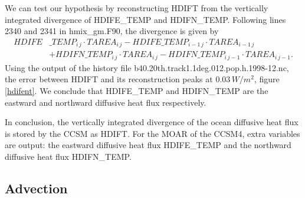 \begin{appendices}
We can test our hypothesis by reconstructing HDIFT from the vertically integrated divergence of HDIFE\_TEMP and HDIFN\_TEMP. Following lines 2340 and 2341 in hmix\_gm.F90, the divergence is given by 
\begin{align}\label{diveq}
HDIFE&\_TEMP_{i \, j}\cdot  TAREA_{i \, j}- HDIFE\_TEMP_{i-1 \, j}\cdot TAREA_{i-1 \, j} \\
&+ HDIFN\_TEMP_{i \, j}\cdot TAREA_{i \, j} - HDIFN\_TEMP_{i \, j-1}\cdot TAREA_{i \, j-1}.
\end{align}
Using the output of the history file b40.20th.track1.1deg.012.pop.h.1998-12.nc, the error between HDIFT and its reconstruction peaks at $0.03 \, W/m^2$, figure \ref{hdifent}. We conclude that HDIFE\_TEMP and HDIFN\_TEMP are the eastward and northward diffusive heat flux respectively. 

In conclusion, the vertically integrated divergence of the ocean diffusive heat flux is stored by the CCSM as HDIFT. For the MOAR of the CCSM4, extra variables are output: the eastward diffusive heat flux HDIFE\_TEMP and the northward diffusive heat flux HDIFN\_TEMP. 


\subsection{Advection}\label{aAdv}


\end{appendices}
